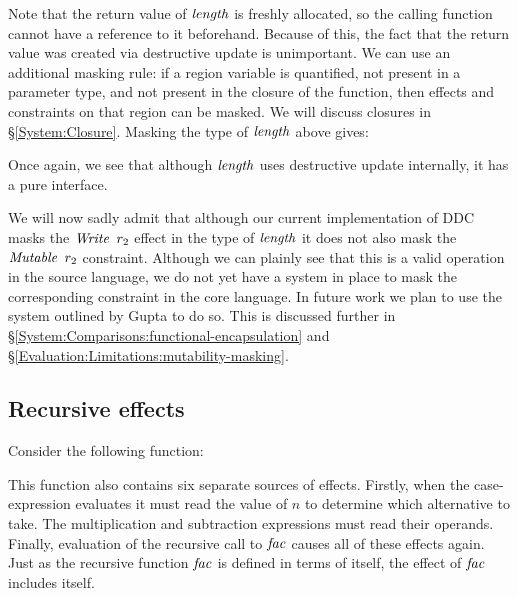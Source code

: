Note that the return value of $\operatorname{\mathit{length}}$ is freshly allocated, so the calling function cannot have a reference to it beforehand. Because of this, the fact that the return value was created via destructive update is unimportant. We can use an additional masking rule: if a region variable is quantified, not present in a parameter type, and not present in the closure of the function, then effects and constraints on that region can be masked. We will discuss closures in \S\ref{System:Closure}. Masking the type of $\operatorname{\mathit{length}}$ above gives:


Once again, we see that although $\operatorname{\mathit{length}}$ uses destructive update internally, it has a pure interface.

We will now sadly admit that although our current implementation of DDC masks the $\operatorname{\mathit{Write}} \ r_2$ effect in the type of $\operatorname{\mathit{length}}$ it does not also mask the $\operatorname{\mathit{Mutable}} \ r_2$ constraint. Although we can plainly see that this is a valid operation in the source language, we do not yet have a system in place to mask the corresponding constraint in the core language. In future work we plan to use the system outlined by Gupta \cite{gupta:functional-encapsulation} to do so. This is discussed further in \S\ref{System:Comparisons:functional-encapsulation} and \S\ref{Evaluation:Limitations:mutability-masking}.

\clearpage{}
\subsection{Recursive effects}
\label{System:Effects:recursive}

Consider the following function:


This function also contains six separate sources of effects. Firstly, when the case-expression evaluates it must read the value of $n$ to determine which alternative to take. The multiplication and subtraction expressions must read their operands. Finally, evaluation of the recursive call to $\operatorname{\mathit{fac}}$ causes all of these effects again. Just as the recursive function $\operatorname{\mathit{fac}}$ is defined in terms of itself, the effect of $\operatorname{\mathit{fac}}$ includes itself.

